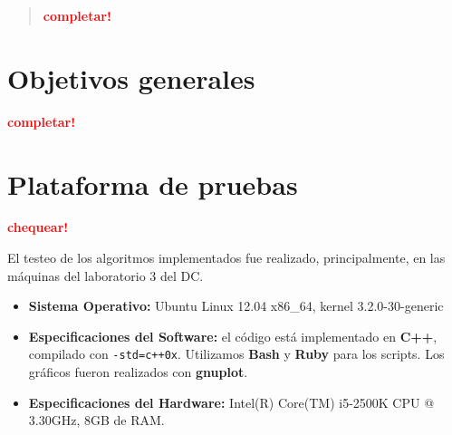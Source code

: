 \documentclass[a4paper]{article}
\begin{document}

\thispagestyle{empty}

\maketitle
\newpage

\thispagestyle{empty}
\vfill
\begin{abstract}
    \vspace{0.5cm}
    \textcolor{red}{\textbf{completar!}}
\end{abstract}

\thispagestyle{empty}
\vspace{1.5cm}
\tableofcontents
\newpage


\newpage
\tableofcontents

\section{Objetivos generales}
\textcolor{red}{\textbf{completar!}}

\newpage

\section{Plataforma de pruebas}

\textcolor{red}{\textbf{chequear!}} \medskip

El testeo de los algoritmos implementados fue realizado, principalmente, en las máquinas del laboratorio 3 del DC. \newline
\begin{itemize}
  \item \textbf{Sistema Operativo:} Ubuntu Linux 12.04 x86_64, kernel 3.2.0-30-generic

  \item \textbf{Especificaciones del Software:} el código está implementado en \textbf{C++}, compilado con \verb|-std=c++0x|.
  Utilizamos \textbf{Bash} y \textbf{Ruby} para los scripts. Los gráficos fueron realizados con \textbf{gnuplot}.

  \item \textbf{Especificaciones del Hardware:} Intel(R) Core(TM) i5-2500K CPU @ 3.30GHz, 8GB de RAM.
\end{itemize}
\end{document}
